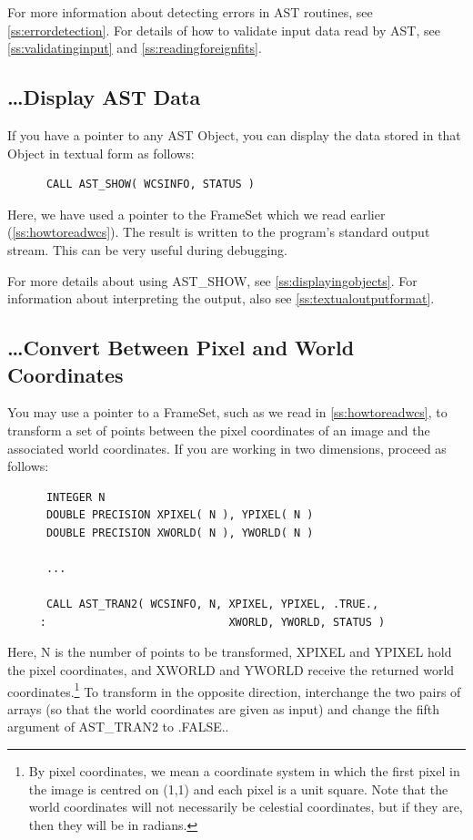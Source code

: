 \documentclass[twoside,11pt]{article}
\newcommand{\htmlref}[2]{#1}
\newcommand{\secref}[1]{\S\ref{#1}}
\renewcommand{\secref}[1]{\ref{#1}}
\begin{document}
For more information about detecting errors in AST routines, see
\secref{ss:errordetection}. For details of how to validate input data
read by AST, see \secref{ss:validatinginput} and
\secref{ss:readingforeignfits}.

\subsection{\ldots Display AST Data}

If you have a pointer to any AST \htmlref{Object}{Object}, you can display the data
stored in that Object in textual form as follows:

\small
\begin{verbatim}
      CALL AST_SHOW( WCSINFO, STATUS )
\end{verbatim}
\normalsize

Here, we have used a pointer to the \htmlref{FrameSet}{FrameSet} which we read earlier
(\secref{ss:howtoreadwcs}).  The result is written to the program's
standard output stream. This can be very useful during debugging.

For more details about using \htmlref{AST\_SHOW}{AST_SHOW}, see
\secref{ss:displayingobjects}. For information about interpreting the
output, also see \secref{ss:textualoutputformat}.

\subsection{\label{ss:howtotransform}\ldots Convert Between Pixel and World Coordinates}

You may use a pointer to a \htmlref{FrameSet}{FrameSet}, such as we read in
\secref{ss:howtoreadwcs}, to transform a set of points between the
pixel coordinates of an image and the associated world coordinates. If
you are working in two dimensions, proceed as follows:

\small
\begin{verbatim}
      INTEGER N
      DOUBLE PRECISION XPIXEL( N ), YPIXEL( N )
      DOUBLE PRECISION XWORLD( N ), YWORLD( N )

      ...

      CALL AST_TRAN2( WCSINFO, N, XPIXEL, YPIXEL, .TRUE.,
     :                            XWORLD, YWORLD, STATUS )
\end{verbatim}
\normalsize

Here, N is the number of points to be transformed, XPIXEL and YPIXEL
hold the pixel coordinates, and XWORLD and YWORLD receive the returned
world coordinates.\footnote{By pixel coordinates, we mean a coordinate
system in which the first pixel in the image is centred on (1,1) and
each pixel is a unit square.  Note that the world coordinates will not
necessarily be celestial coordinates, but if they are, then they will
be in radians.}  To transform in the opposite direction, interchange
the two pairs of arrays (so that the world coordinates are given as
input) and change the fifth argument of \htmlref{AST\_TRAN2}{AST_TRAN2} to .FALSE..
\end{document}
